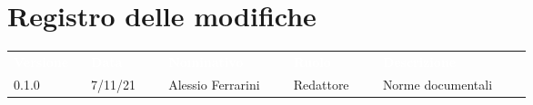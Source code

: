 \section*{Registro delle modifiche}

{\renewcommand{\arraystretch}{1.5}
\begin{tabular}{p{0.13\linewidth}p{0.13\linewidth}p{0.21\linewidth}p{0.15\linewidth}p{0.25\linewidth}}
	\rowcolor[RGB]{33, 73, 50}
	\textcolor{white}{\textbf{Versione}} & \textcolor{white}{\textbf{Data}} & \textcolor{white}
	{\textbf{Nominativo}} & \textcolor{white}{\textbf{Ruolo}} & \textcolor{white}
	{\textbf{Descrizione}}\\
	\rowcolor[RGB]{216, 235, 171}
	0.1.0 & 7/11/21 & Alessio Ferrarini & Redattore & Norme documentali\\
	
\end{tabular}	
}